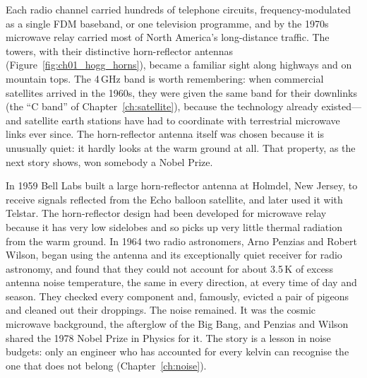 Each radio channel carried hundreds of telephone circuits, frequency-modulated as a single FDM
baseband, or one television programme, and by the 1970s microwave relay carried most of North
America's long-distance traffic. The towers, with their distinctive horn-reflector antennas
(Figure~\ref{fig:ch01_hogg_horns}), became a familiar sight along highways and on mountain tops. The
4\,GHz band is worth remembering: when commercial satellites arrived in the 1960s, they were given the
same band for their downlinks (the ``C band'' of Chapter~\ref{ch:satellite}), because the technology
already existed---and satellite earth stations have had to coordinate with terrestrial microwave links
ever since. The horn-reflector antenna itself was chosen because it is unusually quiet: it hardly
looks at the warm ground at all. That property, as the next story shows, won somebody a Nobel Prize.


\begin{history}
In 1959 Bell Labs built a large horn-reflector antenna at Holmdel, New Jersey, to receive signals
reflected from the Echo balloon satellite, and later used it with Telstar. The horn-reflector design
had been developed for microwave relay because it has very low sidelobes and so picks up very little
thermal radiation from the warm ground. In 1964 two radio astronomers, Arno Penzias and Robert Wilson,
began using the antenna and its exceptionally quiet receiver for radio astronomy, and found that they
could not account for about 3.5\,K of excess antenna noise temperature, the same in every direction,
at every time of day and season. They checked every component and, famously, evicted a pair of
pigeons and cleaned out their droppings. The noise remained. It was the cosmic microwave background,
the afterglow of the Big Bang, and Penzias and Wilson shared the 1978 Nobel Prize in Physics for it.
The story is a lesson in noise budgets: only an engineer who has accounted for every kelvin can
recognise the one that does not belong (Chapter~\ref{ch:noise}).
\end{history}



